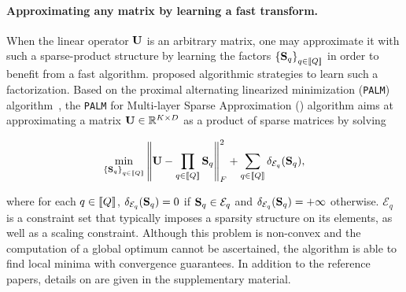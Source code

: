 \paragraph{Approximating any matrix by learning a fast transform.} When the linear operator ${\mathbf{U}}$ is an arbitrary matrix, one may approximate it with such a sparse-product structure by learning the factors $\left \lbrace{\mathbf{S}}_q\right \rbrace_{q\in\left \llbracket Q\right \rrbracket}$ in order to benefit from a fast algorithm.
\citet{LeMagoarou2016Flexible} proposed algorithmic strategies to learn such a factorization. Based on the proximal alternating linearized minimization (\texttt{PALM}) algorithm~\cite{bolte2014proximal}, the \texttt{PALM} for Multi-layer Sparse Approximation (\palm) algorithm aims at approximating a matrix ${\mathbf{U}}\in{\mathbb{R}}^{K\times D}$ as a product of sparse matrices by solving

\begin{align}
\label{eq:palm4msa}
\min_{\left \lbrace{\mathbf{S}}_q\right \rbrace_{q\in\left \llbracket Q\right \rrbracket}} \left \|{\mathbf{U}} -  \prod_{q\in\left \llbracket Q\right \rrbracket}{{\mathbf{S}}_q}\right \|_F^2 + \sum_{q\in\left \llbracket Q\right \rrbracket} \delta_{\mathcal{E}_q}({\mathbf{S}}_q),
\end{align}

where for each $q\in\left \llbracket Q\right \rrbracket$, $\delta_{\mathcal{E}_q}({\mathbf{S}}_q)=0$ 
if ${\mathbf{S}}_q \in \mathcal{E}_q$ and $\delta_{\mathcal{E}_q}({\mathbf{S}}_q)=+\infty$ otherwise. $\mathcal{E}_q$ is a constraint set that typically imposes a sparsity structure on its elements, as well as a scaling constraint. 
Although this problem is non-convex and the computation of a global optimum cannot be
ascertained, the \palm algorithm is able to find %
local minima with convergence guarantees. 
In addition to the reference papers, details on \palm are given in the supplementary material.




